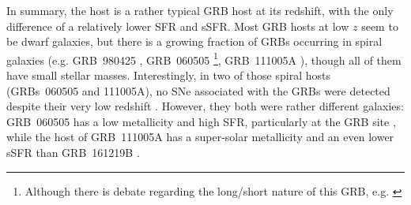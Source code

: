 \documentclass[traditabstract,longauth]{aa}
\begin{document}
In summary, the host is a rather typical GRB host at its redshift, with the only difference of a relatively lower SFR and sSFR. Most GRB hosts at low $z$ seem to be dwarf galaxies, but there is a growing fraction of GRBs occurring in spiral galaxies (e.g. GRB~980425 \citealt{Fynbo00,Christensen08,Kruehler17}, GRB~060505 \citealt{Thoene14}\footnote{Although there is debate regarding the long/short nature of this GRB, e.g. \citet{Ofek07}}, GRB~111005A \citealt{Michalowski16}), though all of them have small stellar masses. Interestingly, in two of those spiral hosts (GRBs~060505 and 111005A), no SNe associated with the GRBs were detected despite their very low redshift \citep{Fynbo06, Michalowski16}. However, they both were rather different galaxies: GRB~060505 has a low metallicity and high SFR, particularly at the GRB site \citep{Thoene08,Thoene14}, while the host of GRB~111005A has a super-solar metallicity and an even lower sSFR than GRB~161219B \citep{Michalowski16}.%
\end{document}
